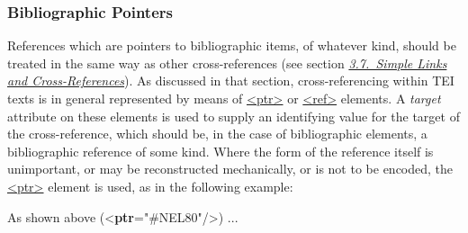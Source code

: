 \subsubsection[{Bibliographic Pointers }]{Bibliographic Pointers }\label{COBIXR}\par
References which are pointers to bibliographic items, of whatever kind, should be treated in the same way as other cross-references (see section \textit{\hyperref[COXR]{3.7.\ Simple Links and Cross-References}}). As discussed in that section, cross-referencing within TEI texts is in general represented by means of \hyperref[TEI.ptr]{<ptr>} or \hyperref[TEI.ref]{<ref>} elements. A {\itshape target} attribute on these elements is used to supply an identifying value for the target of the cross-reference, which should be, in the case of bibliographic elements, a bibliographic reference of some kind. Where the form of the reference itself is unimportant, or may be reconstructed mechanically, or is not to be encoded, the \hyperref[TEI.ptr]{<ptr>} element is used, as in the following example: \par\bgroup{}\exampleFont \begin{shaded}\noindent\mbox{}As shown above ({<\textbf{ptr}\hspace*{1em}{target}="{\#NEL80}"/>}) ...\end{shaded}\egroup\par \par

